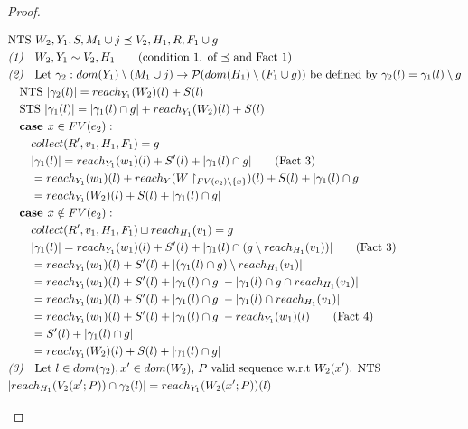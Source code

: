\documentclass[11pt]{article}
\theoremstyle{definition}
\begin{document}
\begin{proof}
\begin{description}
\begin{align*}
		&\text{NTS } W_2,Y_1,S,M_1 \cup j \preceq V_2,H_1,R, F_1 \cup g\\
		&\emph{(1)}\quad W_2,Y_1 \sim V_2,H_1 \tag{condition 1. of $\preceq$ and Fact 1}\\
		&\emph{(2)}\quad \text{Let } \gamma_2 : dom(Y_1) \setminus (M_1 \cup j) 
			\to \mathcal{P}(dom(H_1)\setminus (F_1 \cup g)) \text{ be defined by } 
			\gamma_2(l) = \gamma_1(l) \setminus g\\
		&\quad \text{NTS } |\gamma_2(l)| = reach_{Y_1}(W_2)(l) + S(l)\\
		&\quad \text{STS } |\gamma_1(l)| = |\gamma_1(l) \cap g| + reach_{Y_1}(W_2)(l) + S(l)\\
		&\quad \textbf{case } x \in FV(e_2):\\
		&\quad\quad collect(R',v_1,H_1,F_1) = g\\
		&\quad\quad |\gamma_1(l)| = reach_{Y_1}(w_1)(l) + S'(l) + |\gamma_1(l) \cap g| \tag{Fact 3}\\
		&\quad\quad = reach_{Y_1}(w_1)(l) + 
			reach_{Y}(W\restriction_{FV(e_2) \setminus \{x\}})(l) + S(l) + |\gamma_1(l) \cap g| \\
		&\quad\quad = reach_{Y_1}(W_2)(l) + S(l) + |\gamma_1(l) \cap g| \\
		&\quad \textbf{case } x \notin FV(e_2):\\
		&\quad\quad collect(R',v_1,H_1,F_1) \sqcup reach_{H_1}(v_1) = g\\
		&\quad\quad |\gamma_1(l)| = reach_{Y_1}(w_1)(l) + S'(l) + 
			|\gamma_1(l) \cap (g \setminus reach_{H_1}(v_1))| \tag{Fact 3}\\
		&\quad\quad = reach_{Y_1}(w_1)(l) + S'(l) + |(\gamma_1(l) \cap g) \setminus reach_{H_1}(v_1)|\\
		&\quad\quad = reach_{Y_1}(w_1)(l) + S'(l) + |\gamma_1(l) \cap g| - 
			|\gamma_1(l) \cap g \cap reach_{H_1}(v_1)|\\
		&\quad\quad = reach_{Y_1}(w_1)(l) + S'(l) + |\gamma_1(l) \cap g| - 
			|\gamma_1(l) \cap reach_{H_1}(v_1)|\\
		&\quad\quad = reach_{Y_1}(w_1)(l) + S'(l) + |\gamma_1(l) \cap g| - reach_{Y_1}(w_1)(l) 
			\tag{Fact 4}\\
		&\quad\quad = S'(l) + |\gamma_1(l) \cap g|\\
		&\quad\quad = reach_{Y_1}(W_2)(l) + S(l) + |\gamma_1(l) \cap g|\\
		&\emph{(3)}\quad \text{Let $l \in dom(\gamma_2), x' \in dom(W_2)$, 
			$P$ valid sequence w.r.t $W_2(x')$. NTS }\\ 
		&|reach_{H_1}(V_2(x';P)) \cap \gamma_2(l)| = reach_{Y_1}(W_2(x';P))(l)\\ 

\end{align*}
\end{description}
\end{proof}
\end{document}
